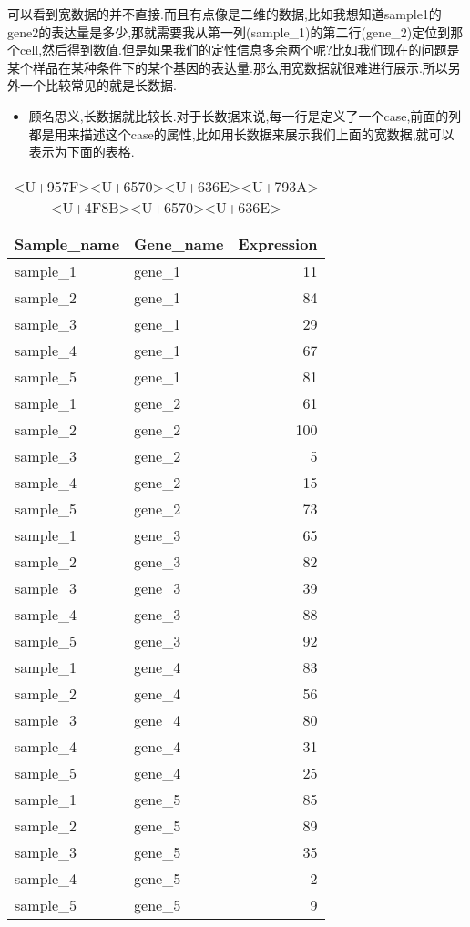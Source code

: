 \documentclass[]{book}
\providecommand{\tightlist}{%
  \setlength{\itemsep}{0pt}\setlength{\parskip}{0pt}}
\begin{document}
可以看到宽数据的并不直接.而且有点像是二维的数据,比如我想知道sample1的gene2的表达量是多少,那就需要我从第一列(sample\_1)的第二行(gene\_2)定位到那个cell,然后得到数值.但是如果我们的定性信息多余两个呢?比如我们现在的问题是某个样品在某种条件下的某个基因的表达量.那么用宽数据就很难进行展示.所以另外一个比较常见的就是长数据.

\begin{itemize}
\tightlist
\item
  顾名思义,长数据就比较长.对于长数据来说,每一行是定义了一个case,前面的列都是用来描述这个case的属性,比如用长数据来展示我们上面的宽数据,就可以表示为下面的表格.
\end{itemize}

\begin{table}

\caption{\label{tab:unnamed-chunk-2}<U+957F><U+6570><U+636E><U+793A><U+4F8B><U+6570><U+636E>}
\centering
\begin{tabular}[t]{llr}
\toprule
Sample\_name & Gene\_name & Expression\\
\midrule
sample\_1 & gene\_1 & 11\\
sample\_2 & gene\_1 & 84\\
sample\_3 & gene\_1 & 29\\
sample\_4 & gene\_1 & 67\\
sample\_5 & gene\_1 & 81\\
\addlinespace
sample\_1 & gene\_2 & 61\\
sample\_2 & gene\_2 & 100\\
sample\_3 & gene\_2 & 5\\
sample\_4 & gene\_2 & 15\\
sample\_5 & gene\_2 & 73\\
\addlinespace
sample\_1 & gene\_3 & 65\\
sample\_2 & gene\_3 & 82\\
sample\_3 & gene\_3 & 39\\
sample\_4 & gene\_3 & 88\\
sample\_5 & gene\_3 & 92\\
\addlinespace
sample\_1 & gene\_4 & 83\\
sample\_2 & gene\_4 & 56\\
sample\_3 & gene\_4 & 80\\
sample\_4 & gene\_4 & 31\\
sample\_5 & gene\_4 & 25\\
\addlinespace
sample\_1 & gene\_5 & 85\\
sample\_2 & gene\_5 & 89\\
sample\_3 & gene\_5 & 35\\
sample\_4 & gene\_5 & 2\\
sample\_5 & gene\_5 & 9\\
\bottomrule
\end{tabular}
\end{table}
\end{document}
